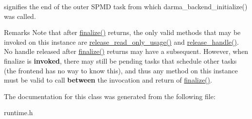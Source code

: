 signifies the end of the outer S\+P\+MD task from which darma\+\_\+backend\+\_\+initialize() was called. 

\begin{DoxyRemark}{Remarks}
Note that after \hyperlink{classdarma__runtime_1_1abstract_1_1backend_1_1_runtime_af889e310f4ec8b0300d42fe934fad8a3}{finalize()} returns, the only valid methods that may be invoked on this instance are \hyperlink{classdarma__runtime_1_1abstract_1_1backend_1_1_runtime_a737e5704115b99df2ce2806b42ac76b1}{release\+\_\+read\+\_\+only\+\_\+usage()} and \hyperlink{classdarma__runtime_1_1abstract_1_1backend_1_1_runtime_a54ba21615ed22638ea23a2a1f03fea02}{release\+\_\+handle()}. No handle released after \hyperlink{classdarma__runtime_1_1abstract_1_1backend_1_1_runtime_af889e310f4ec8b0300d42fe934fad8a3}{finalize()} returns may have a subsequent. However, when finalize is {\bfseries invoked}, there may still be pending tasks that schedule other tasks (the frontend has no way to know this), and thus any method on this instance must be valid to call {\bfseries between} the invocation and return of \hyperlink{classdarma__runtime_1_1abstract_1_1backend_1_1_runtime_af889e310f4ec8b0300d42fe934fad8a3}{finalize()}. 
\end{DoxyRemark}


The documentation for this class was generated from the following file\+:\begin{DoxyCompactItemize}
\item 
runtime.\+h\end{DoxyCompactItemize}
